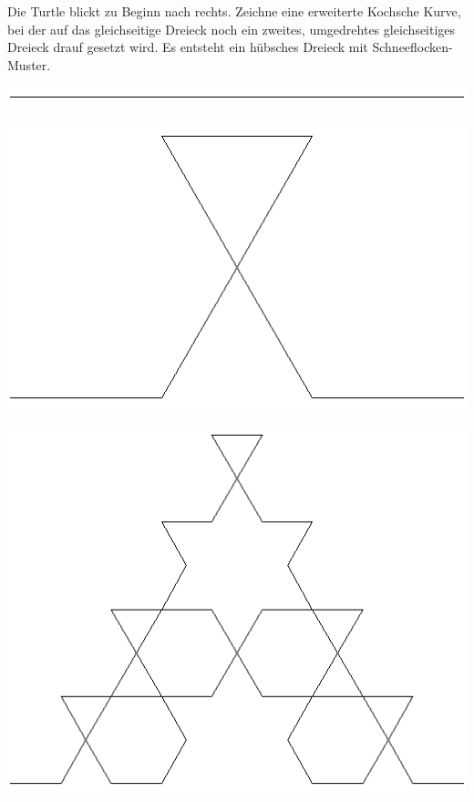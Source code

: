 \begin{minipage}[b]{0.5\textwidth}
Die Turtle blickt zu Beginn nach rechts. Zeichne eine erweiterte Kochsche
Kurve, bei der auf das gleichseitige Dreieck noch ein  zweites, umgedrehtes
gleichseitiges Dreieck drauf gesetzt wird. Es entsteht ein hübsches Dreieck mit
Schneeflocken-Muster.
\end{minipage}\hspace{2mm}
\begin{minipage}[b]{0.1\textwidth}
  \centering
  \includegraphics[width=1.0\textwidth]{./inf/SEKII/06_Java_Rekursion/Aufgabe3_5-1.png}
\end{minipage}\hspace{2mm}
\begin{minipage}[b]{0.15\textwidth}
  \centering
  \includegraphics[width=1.0\textwidth]{./inf/SEKII/06_Java_Rekursion/Aufgabe3_5-2.png}
\end{minipage}\hspace{2mm}
\begin{minipage}[b]{0.2\textwidth}
  \centering
  \includegraphics[width=1.0\textwidth]{./inf/SEKII/06_Java_Rekursion/Aufgabe3_5-3.png}
\end{minipage}



